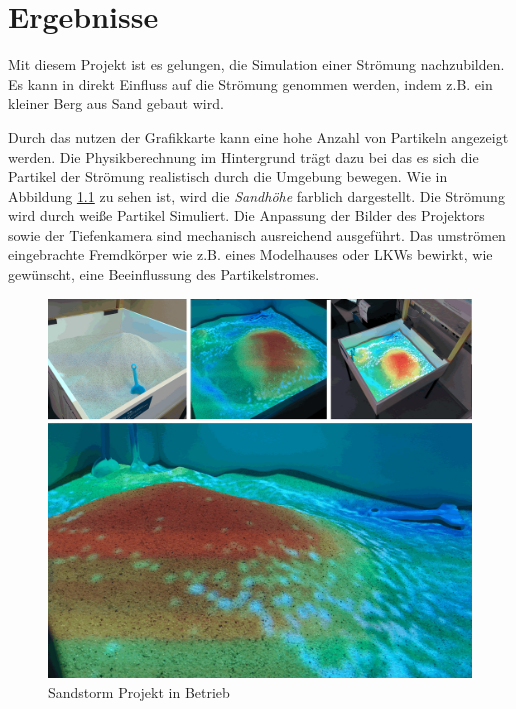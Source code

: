 \chapter{Ergebnisse}
\begin{Spacing}{\mylinespace}

Mit diesem Projekt ist es gelungen, die Simulation einer Strömung nachzubilden. Es kann in direkt Einfluss auf die Strömung genommen werden, indem z.B. ein kleiner Berg aus Sand gebaut wird.

Durch das nutzen der Grafikkarte kann eine hohe Anzahl von Partikeln angezeigt werden. Die Physikberechnung im Hintergrund trägt dazu bei das es sich die Partikel der Strömung realistisch durch die Umgebung bewegen. Wie in Abbildung \ref{fig:Results} zu sehen ist, wird die \textit{Sandhöhe} farblich dargestellt. Die Strömung wird durch weiße Partikel Simuliert. Die Anpassung der Bilder des Projektors sowie der Tiefenkamera sind mechanisch ausreichend ausgeführt. Das umströmen eingebrachte Fremdkörper wie z.B. eines Modelhauses oder LKWs bewirkt, wie gewünscht, eine Beeinflussung des Partikelstromes. 

\begin{figure}[h!]
	\vspace*{30px}
	\includegraphics[width=\textwidth]{graphics/results.png}	
	\caption{Sandstorm Projekt in Betrieb}
	\label{fig:Results}
\end{figure}

\end{Spacing}
\newpage
\clearpage
